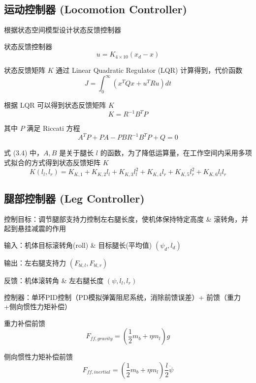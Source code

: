 \documentclass[
  oneside,
  degree=bachelor,
  fullwidthstop=false,
  fontset=fandol,
  times=false,
  minted=true,
  biblatex=true,
]{tongjithesis}
\begin{document}
\subsection{运动控制器 (Locomotion Controller)}
根据状态空间模型设计状态反馈控制器

状态反馈控制器
\begin{equation}
u = K_{4 \times 10}(x_d - x) 
\end{equation}

状态反馈矩阵 $K$ 通过 Linear Quadratic Regulator (LQR) 计算得到，代价函数
\begin{equation}
J = \int_{0}^{\infty} (x^T Q x + u^T R u) dt 
\end{equation}

根据 LQR 可以得到状态反馈矩阵 $K$
\begin{equation}
K = R^{-1} B^T P 
\end{equation}

其中 $P$ 满足 Riccati 方程
\begin{equation}
A^T P + P A - P B R^{-1} B^T P + Q = 0 
\end{equation}

式 (3.4) 中，$A, B$ 是关于腿长 $l$ 的函数，为了降低运算量，在工作空间内采用多项式拟合的方式得到状态反馈矩阵 $K$
\begin{equation}
K(l_l, l_r) = K_{K,1} + K_{K,2} l_l + K_{K,3} l_l^2 + K_{K,4} l_r + K_{K,5} l_r^2 + K_{K,6} l_l l_r 
\end{equation}

\subsection{腿部控制器 (Leg Controller)}
控制目标：调节腿部支持力控制左右腿长度，使机体保持特定高度 \& 滚转角，并起到悬挂减震的作用

输入：机体目标滚转角(roll) \& 目标腿长(平均值) $(\psi_d, l_d)$

输出：左右腿支持力 $(F_{bl,l}, F_{bl,r})$

反馈：机体滚转角 \& 左右腿长度 $(\psi, l_l, l_r)$

控制器：单环PID控制（PD模拟弹簧阻尼系统，消除前馈误差）+ 前馈（重力+侧向惯性力矩补偿）

重力补偿前馈
\begin{equation}
F_{ff,gravity} = \left(\frac{1}{2}m_b + \eta m_l\right)g 
\end{equation}

侧向惯性力矩补偿前馈
\begin{equation}
F_{ff,inertial} = \left(\frac{1}{2}m_b + \eta m_l\right) \frac{l}{2} \ddot{\psi} 
\end{equation}
\end{document}
